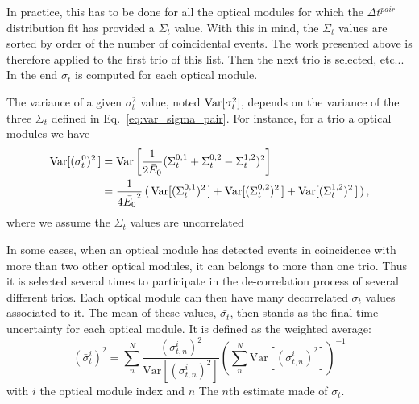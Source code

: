 In practice, this has to be done for all the optical modules for which the $\Delta {t}^{pair}$ distribution fit has provided a $\Sigma_{t}$ value.
With this in mind, the $\Sigma_{t}$ values are sorted by order of the number of coincidental events.
The work presented above is therefore applied to the first trio of this list.
Then the next trio is selected, etc...
In the end $\sigma_{t}$ is computed for each optical module.

The variance of a given $\sigma_{t}^{2}$ value, noted $\mathrm{Var}[\sigma_{t}^{2}]$, depends on the variance of the three $\Sigma_{t}$ defined in Eq.~\eqref{eq:var_sigma_pair}.
For instance, for a trio a optical modules we have
\begin{align}
  \mathrm{Var}[(\sigma_{t}^{0})^{2}\,] &= \mathrm{Var} \left[ \frac{1}{2\bar{E}_{0}} (\Sigma_{t}^{0,1}+\Sigma_{t}^{0,2}-\Sigma_{t}^{1,2})^{2} \right] \\
  &= \frac{1}{4\bar{E_{0}}^{2}}\, (\,\mathrm{Var}[(\Sigma_{t}^{0,1})^{2}\,]+\mathrm{Var}[(\Sigma_{t}^{0,2})^{2}\,]+\mathrm{Var}[(\Sigma_{t}^{1,2})^{2}\,]\,)\,,
\end{align}
where we assume the $\Sigma_{t}$ values are uncorrelated

In some cases, when an optical module has detected events in coincidence with more than two other optical modules, it can belongs to more than one trio.
Thus it is selected several times to participate in the de-correlation process of several different trios.
Each optical module can then have many decorrelated $\sigma_{t}$ values associated to it.
The mean of these values, $\bar{\sigma_{t}}$, then stands as the final time uncertainty for each optical module.
It is defined as the weighted average:
\begin{equation}
  \displaystyle
 (\bar\sigma^i_{t})^2 = \sum_n^N  \dfrac{(\sigma^i_{t, n})^2}{\text{Var}[(\sigma^i_{t, n})^2]} \left(\sum_n^N \text{Var}[(\sigma^i_{t, n})^2]\right)^{-1}
\end{equation}
with $i$ the optical module index and $n$ The $n$th estimate made of $\sigma_{t}$.


